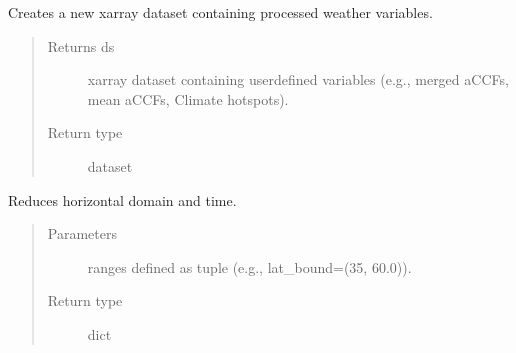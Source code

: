 \documentclass[a4paper,11pt,english]{sphinxmanual}
\begin{document}
\begin{fulllineitems}
\begin{fulllineitems}
\end{fulllineitems}


\begin{fulllineitems}
\label{\detokenize{modules:envlib.weather_store.WeatherStore.get_xarray}}
Creates a new xarray dataset containing processed weather variables.
\begin{quote}\begin{description}
\item[{Returns ds}] \leavevmode
xarray dataset containing user\sphinxhyphen{}defined variables (e.g., merged aCCFs, mean aCCFs, Climate hotspots).

\item[{Return type}] \leavevmode
dataset

\end{description}\end{quote}

\end{fulllineitems}


\begin{fulllineitems}
\label{\detokenize{modules:envlib.weather_store.WeatherStore.reduce_domain}}
Reduces horizontal domain and time.
\begin{quote}\begin{description}
\item[{Parameters}] \leavevmode
{} \textendash{} ranges defined as tuple (e.g., lat\_bound=(35, 60.0)).

\item[{Return type}] \leavevmode
dict

\end{description}\end{quote}

\end{fulllineitems}


\end{fulllineitems}
\end{document}
